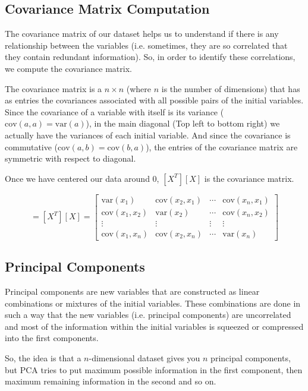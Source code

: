 \subsection{Covariance Matrix Computation}
The covariance matrix of our dataset helps us to understand if there 
is any relationship between the variables (i.e. sometimes, they are 
so correlated that they contain redundant information). So, in order to identify these correlations, we compute the covariance matrix.

The covariance matrix is a $n\times n$ (where $n$ is the number of dimensions) that has as entries the covariances associated with all possible pairs of the initial variables. Since the covariance of a variable with itself is its variance ($\textrm{cov}(a, a)= \textrm{var}(a)$), in the main diagonal (Top left to bottom right) we actually have the variances of each initial variable. And since the covariance is commutative ($\textrm{cov}(a, b) = \textrm{cov}(b, a)$), the entries of the covariance matrix are symmetric with respect to diagonal.

Once we have centered our data around 0, $[X^T][X]$ is the covariance matrix.

\begin{equation}
[\Sigma]=[X^T][X] =
\begin{bmatrix}
\textrm{var}(x_1) & \textrm{cov}(x_2, x_1) & \cdots & \textrm{cov}(x_n, x_1) \\
\textrm{cov}(x_1, x_2) & \textrm{var}(x_2) & \cdots & \textrm{cov}(x_n, x_2) \\
\vdots & \vdots & \vdots & \vdots \\
\textrm{cov}(x_1, x_n) & \textrm{cov}(x_2, x_n) & \cdots & \textrm{var}(x_n)
\end{bmatrix}
\end{equation}

\subsection{Principal Components}

Principal components are new variables that are constructed as linear combinations or mixtures of the initial variables. These combinations are done in such a way that the new variables (i.e. principal components) are uncorrelated and most of the information within the initial variables is squeezed or compressed into the first components. 

So, the idea is that a $n$-dimensional dataset gives you $n$ principal components, but PCA tries to put maximum possible information in the first component, then maximum remaining information in the second and so on.

